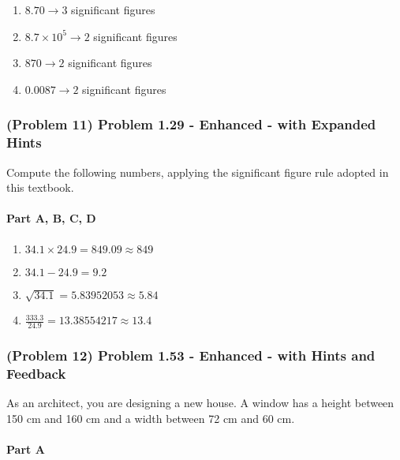 \vspace{1em}

\begin{solution}
	\begin{enumerate}[label=\Alph*.]
		\item $8.70 \to 3$ significant figures
		\item $8.7 \times 10^{5} \to 2$ significant figures
		\item $870 \to 2$ significant figures
		\item $0.0087 \to 2$ significant figures
	\end{enumerate}
\end{solution}

\subsubsection{(Problem 11) Problem 1.29 - Enhanced - with Expanded Hints}

Compute the following numbers, applying the significant figure rule adopted in this textbook.

\paragraph{Part A, B, C, D}

\begin{solution}
	\begin{enumerate}[label=\Alph*.]
		\item $34.1 \times 24.9 = 849.09 \approx 849$
		\item $34.1 - 24.9 = 9.2$
		\item $\sqrt{34.1} = 5.83952053 \approx 5.84$
		\item $\frac{333.3}{24.9} = 13.38554217 \approx 13.4$
	\end{enumerate}
\end{solution}

\newpage

\subsubsection{(Problem 12) Problem 1.53 - Enhanced - with Hints and Feedback}

As an architect, you are designing a new house. A window has a height between 150 cm and 160 cm and a width between 72 cm and 60 cm.

\paragraph{Part A}

